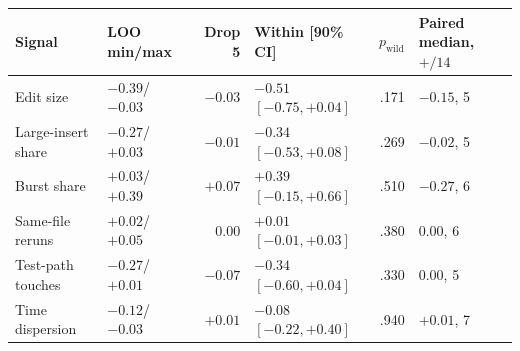 \begin{table}[!htbp]
\medskip

\begin{tabular}{@{}l l r l r l@{}}
\toprule
Signal & LOO min/max & Drop 5 & Within [90\% CI] & $p_{\text{wild}}$ & Paired median, $+/14$ \\
\midrule
Edit size & $-0.39$/$-0.03$ & $-0.03$ & $-0.51$ $[-0.75, +0.04]$ & .171 & $-0.15$, 5 \\
Large-insert share & $-0.27$/$+0.03$ & $-0.01$ & $-0.34$ $[-0.53, +0.08]$ & .269 & $-0.02$, 5 \\
Burst share & $+0.03$/$+0.39$ & $+0.07$ & $+0.39$ $[-0.15, +0.66]$ & .510 & $-0.27$, 6 \\
Same-file reruns & $+0.02$/$+0.05$ & $0.00$ & $+0.01$ $[-0.01, +0.03]$ & .380 & $0.00$, 6 \\
Test-path touches & $-0.27$/$+0.01$ & $-0.07$ & $-0.34$ $[-0.60, +0.04]$ & .330 & $0.00$, 5 \\
Time dispersion & $-0.12$/$-0.03$ & $+0.01$ & $-0.08$ $[-0.22, +0.40]$ & .940 & $+0.01$, 7 \\
\bottomrule
\end{tabular}
\end{table}
